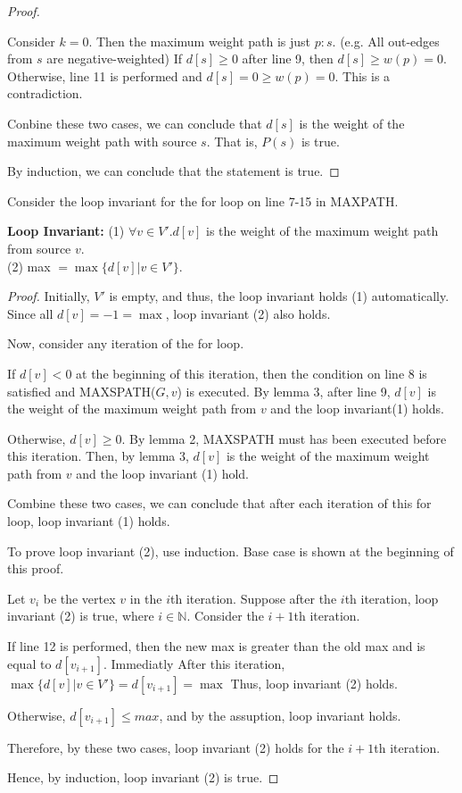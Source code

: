 \documentclass[10pt]{article}
\begin{document}
\begin{proof}
\begin{addmargin}[1em]{0em}
		Consider $k = 0$. 
		Then the maximum weight path is just $p: s$.
		(e.g. All out-edges from $s$ are negative-weighted) 
		If $d[s] \geq 0$ after line 9, then $d[s] \geq w(p) = 0$.
		Otherwise, line 11 is performed and $d[s] = 0 \geq w(p) = 0$.
		This is a contradiction. 

		Conbine these two cases, we can conclude that $d[s]$ is the weight of
		the maximum weight path with source $s$.
		That is, $P(s)$ is true.
	\end{addmargin}

	By induction, we can conclude that the statement is true. 
\end{proof}


Consider the loop invariant for the for loop on line 7-15 in MAXPATH.

\textbf{Loop Invariant:} 
	(1) $\forall v \in V'. d[v]$ is the weight of the maximum weight path from
	source $v$.\\ 
	(2) max $= \max\{d[v] | v \in V'\}$.

\begin{proof}
	Initially, $V'$ is empty, and thus, the loop invariant holds (1) automatically.
	Since all $d[v] = -1 = \max$, loop invariant (2) also holds. 

	Now, consider any iteration of the for loop.

	If $d[v] < 0$ at the beginning of this iteration, then the condition on
	line 8 is satisfied and MAXSPATH($G, v$) is executed. 
	By lemma 3, after line 9, $d[v]$ is the weight of the maximum weight path
	from $v$ and the loop invariant(1) holds.
	
	Otherwise, $d[v] \geq 0$. 
	By lemma 2, MAXSPATH must has been executed before this iteration.
	Then, by lemma 3, $d[v]$ is the weight of the maximum weight path from $v$
	and the loop invariant (1) hold.

	Combine these two cases, we can conclude that after each iteration of this
	for loop, loop invariant (1) holds. 

	To prove loop invariant (2), use induction.
	Base case is shown at the beginning of this proof. 

	Let $v_i$ be the vertex $v$ in the $i$th iteration.
	Suppose after the $i$th iteration, loop invariant (2) is true, where $i \in
	\mathbb{N}$.
	Consider the $i+1$th iteration. 

	If line 12 is performed, then the new max is greater than the old max and
	is equal to $d[v_{i+1}]$.
	Immediatly After this iteration, $\max\{d[v] | v \in V'\} = d[v_{i+1}]
	= \max$
	Thus, loop invariant (2) holds.

	Otherwise, $d[v_{i+1}] \leq max$, and by the assuption, loop invariant
	holds. 

	Therefore, by these two cases, loop invariant (2) holds for the $i+1$th
	iteration. 

	Hence, by induction, loop invariant (2) is true.
\end{proof}
\end{document}
